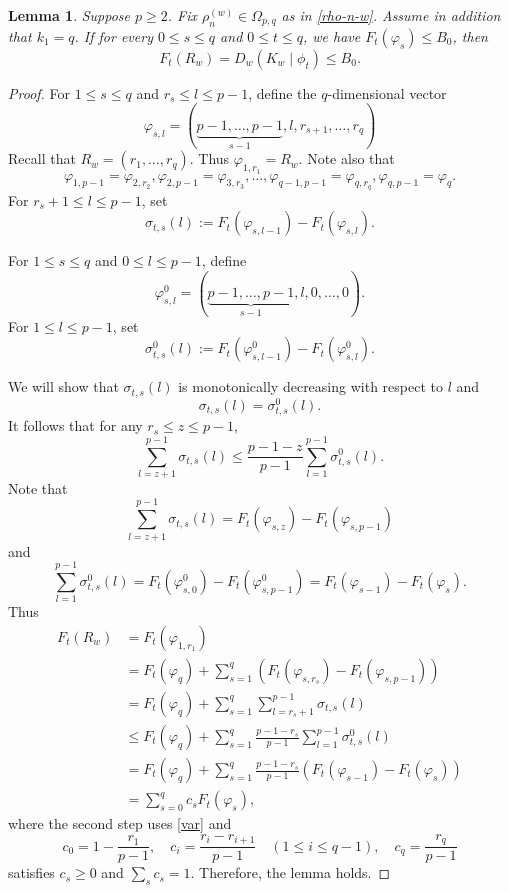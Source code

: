 \documentclass[11pt]{amsart}
\theoremstyle{plain}
\newtheorem{lemma}[thm]{Lemma}
\theoremstyle{definition}
\begin{document}
\begin{lemma}\label{lem-p}
Suppose $p\ge 2$. Fix $\rho_n^{(w)}\in\Omega_{p,q}$ as in \eqref{rho-n-w}. Assume in addition that $k_1=q$.
	If for every $0\le s\le q$ and $0\le t\le q$, we have $F_t(\varphi_s)\le B_0$, then
	\[F_t(R_w)=D_w(K_w\mid \phi_t)\le B_0.\]
\end{lemma}
\begin{proof}	For $1\le s\le q$ and $r_{s}\le l\le p-1$, define the $q$-dimensional vector
	\[\varphi_{s,l}=(\underbrace{p-1,\dots,p-1}_{s-1},l,r_{s+1},\dots,r_q)\]
Recall that $R_w=(r_1,\dots,r_q)$.	
Thus $\varphi_{1,r_1}=R_w$. Note also that
\begin{equation}\label{var}
\varphi_{1, p-1}=\varphi_{2, r_2}, \varphi_{2, p-1}=\varphi_{3, r_3}, \dots,
\varphi_{q-1, p-1}=\varphi_{q, r_q}, \varphi_{q, p-1}=\varphi_{q}.
\end{equation}
For $r_{s}+1\le l\le p-1$, set
\[\sigma_{t,s}(l):=F_t(\varphi_{s,l-1})-F_t(\varphi_{s,l}).\]

For $1\le s\le q$ and $0\le l\le p-1$, define
\[\varphi_{s,l}^0=(\underbrace{p-1,\dots,p-1}_{s-1},l,0,\dots,0).\]
For $1\le l\le p-1$, set
	\[\sigma_{t,s}^0(l):=F_t(\varphi^0_{s,l-1})-F_t(\varphi^0_{s,l}).\]
	

We will show that $\sigma_{t,s}(l)$ is monotonically decreasing with respect to $l$ and
	\[\sigma_{t,s}(l)=\sigma_{t,s}^0(l).\]
It follows that for any $r_s\le z\le p-1$,
	\[\sum_{l=z+1}^{p-1}\sigma_{t,s}(l)\le \frac{p-1-z}{p-1}\sum_{l=1}^{p-1}\sigma_{t,s}^0(l).\]
	Note that	\[\sum_{l=z+1}^{p-1}\sigma_{t,s}(l)=F_t(\varphi_{s,z})-F_{t}(\varphi_{s,p-1})\]
	and
\[
\sum_{l=1}^{p-1}\sigma^0_{t,s}(l)
=F_t(\varphi_{s,0}^0)-F_{t}(\varphi_{s,p-1}^0)
=F_t(\varphi_{s-1})-F_t(\varphi_s).\]
	Thus
	\begin{align*}
		F_t(R_w)&= F_t(\varphi_{1, r_1})\\
&=F_t(\varphi_{q}) + \sum_{s=1}^{q} (F_t(\varphi_{s, r_s}) - F_t(\varphi_{s, p-1}))\\
&=F_t(\varphi_{q})+\sum_{s=1}^q\sum_{l=r_s+1}^{p-1}\sigma_{t,s}(l)\\
		&\le F_t(\varphi_{q})+\sum_{s=1}^q  \frac{p-1-r_s}{p-1} \sum_{l=1}^{p-1} \sigma^0_{t,s}(l)\\
&= F_t(\varphi_{q})+\sum_{s=1}^q  \frac{p-1-r_s}{p-1} (F_t(\varphi_{s-1})-F_t(\varphi_s))\\
&=\sum_{s=0}^qc_s F_t(\varphi_s),
	\end{align*}
	where the second step uses \eqref{var} and
	\[c_0=1-\dfrac{r_1}{p-1},\quad c_i=\dfrac{r_{i}-r_{i+1}}{p-1}\quad(1\le i\le q-1),\quad
	c_q=\dfrac{r_q}{p-1}\]
	satisfies $c_s\ge 0$ and $\sum_sc_s=1$. Therefore, the lemma holds.



\end{proof}
\end{document}
